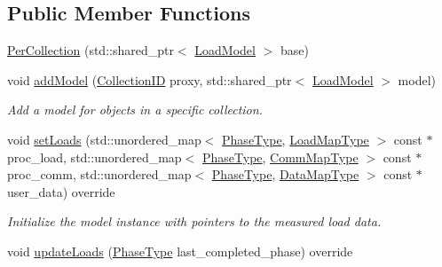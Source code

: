 \subsection*{Public Member Functions}
\begin{DoxyCompactItemize}
\item 
\hyperlink{structvt_1_1vrt_1_1collection_1_1balance_1_1_per_collection_aa149a252fec1619bd947e53e3a66b854}{Per\+Collection} (std\+::shared\+\_\+ptr$<$ \hyperlink{structvt_1_1vrt_1_1collection_1_1balance_1_1_load_model}{Load\+Model} $>$ base)
\item 
void \hyperlink{structvt_1_1vrt_1_1collection_1_1balance_1_1_per_collection_a79ecd769664dcaabe413a5d77033b81b}{add\+Model} (\hyperlink{structvt_1_1vrt_1_1collection_1_1balance_1_1_per_collection_ade08a6857f727a0a9d1ef63b25fc5b71}{Collection\+ID} proxy, std\+::shared\+\_\+ptr$<$ \hyperlink{structvt_1_1vrt_1_1collection_1_1balance_1_1_load_model}{Load\+Model} $>$ model)
\begin{DoxyCompactList}\small\item\em Add a model for objects in a specific collection. \end{DoxyCompactList}\item 
void \hyperlink{structvt_1_1vrt_1_1collection_1_1balance_1_1_per_collection_a9158b31a385b34a0109cac3bc0e281a6}{set\+Loads} (std\+::unordered\+\_\+map$<$ \hyperlink{namespacevt_a46ce6733d5cdbd735d561b7b4029f6d7}{Phase\+Type}, \hyperlink{namespacevt_1_1vrt_1_1collection_1_1balance_a5339303db2e1ce964d783a53fd74e6b1}{Load\+Map\+Type} $>$ const $\ast$proc\+\_\+load, std\+::unordered\+\_\+map$<$ \hyperlink{namespacevt_a46ce6733d5cdbd735d561b7b4029f6d7}{Phase\+Type}, \hyperlink{namespacevt_1_1vrt_1_1collection_1_1balance_a01ee1fb0ae2da1d2ab7fdca3be9ae351}{Comm\+Map\+Type} $>$ const $\ast$proc\+\_\+comm, std\+::unordered\+\_\+map$<$ \hyperlink{namespacevt_a46ce6733d5cdbd735d561b7b4029f6d7}{Phase\+Type}, \hyperlink{namespacevt_1_1vrt_1_1collection_1_1balance_acf152c668ed9e2e9c6b29784181d2435}{Data\+Map\+Type} $>$ const $\ast$user\+\_\+data) override
\begin{DoxyCompactList}\small\item\em Initialize the model instance with pointers to the measured load data. \end{DoxyCompactList}\item 
void \hyperlink{structvt_1_1vrt_1_1collection_1_1balance_1_1_per_collection_a2b41fbbe2b684654f8dbfd9207b77501}{update\+Loads} (\hyperlink{namespacevt_a46ce6733d5cdbd735d561b7b4029f6d7}{Phase\+Type} last\+\_\+completed\+\_\+phase) override

\end{DoxyCompactItemize}
